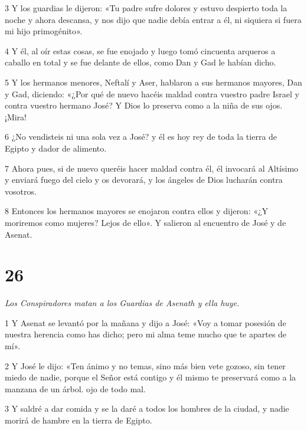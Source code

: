 \par 3 Y los guardias le dijeron: «Tu padre sufre dolores y estuvo despierto toda la noche y ahora descansa, y nos dijo que nadie debía entrar a él, ni siquiera si fuera mi hijo primogénito».

\par 4 Y él, al oír estas cosas, se fue enojado y luego tomó cincuenta arqueros a caballo en total y se fue delante de ellos, como Dan y Gad le habían dicho.

\par 5 Y los hermanos menores, Neftalí y Aser, hablaron a sus hermanos mayores, Dan y Gad, diciendo: «¿Por qué de nuevo hacéis maldad contra vuestro padre Israel y contra vuestro hermano José? Y Dios lo preserva como a la niña de sus ojos. ¡Mira!

\par 6 ¿No vendisteis ni una sola vez a José? y él es hoy rey ​​de toda la tierra de Egipto y dador de alimento.

\par 7 Ahora pues, si de nuevo queréis hacer maldad contra él, él invocará al Altísimo y enviará fuego del cielo y os devorará, y los ángeles de Dios lucharán contra vosotros.

\par 8 Entonces los hermanos mayores se enojaron contra ellos y dijeron: «¿Y moriremos como mujeres? Lejos de ello». Y salieron al encuentro de José y de Asenat.

\chapter{26}

\par \textit{Los Conspiradores matan a los Guardias de Asenath y ella huye.}


\par 1 Y Asenat se levantó por la mañana y dijo a José: «Voy a tomar posesión de nuestra herencia como has dicho; pero mi alma teme mucho que te apartes de mí».

\par 2 Y José le dijo: «Ten ánimo y no temas, sino más bien vete gozoso, sin tener miedo de nadie, porque el Señor está contigo y él mismo te preservará como a la manzana de un árbol. ojo de todo mal.

\par 3 Y saldré a dar comida y se la daré a todos los hombres de la ciudad, y nadie morirá de hambre en la tierra de Egipto.

